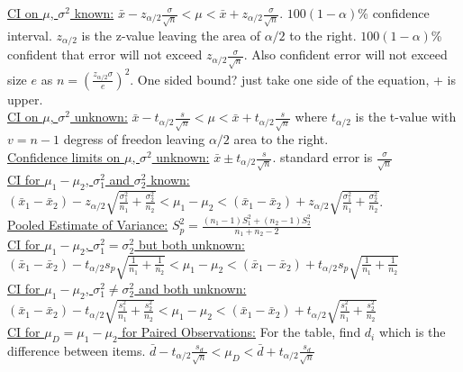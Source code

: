 \documentclass[9pt]{article}
\begin{document}
    \begin{multicols}{2}
        \noindent\uline{CI on $\mu$, $\sigma^2$ known:} $\bar{x}-z_{\alpha/2}\frac{\sigma}{\sqrt{n}} < \mu < \bar{x}+z_{\alpha/2}\frac{\sigma}{\sqrt{n}}$. $100(1-\alpha)$\% confidence interval.
        $z_{\alpha/2}$ is the z-value leaving the area of $\alpha/2$ to the right. $100(1-\alpha)$\% confident that error will not exceed $z_{\alpha/2}\frac{\sigma}{\sqrt{n}}$. Also confident error
        will not exceed size $e$ as $n=(\frac{z_{\alpha/2}\sigma}{e})^2$. One sided bound? just take one side of the equation, + is upper.\\
        \uline{CI on $\mu$, $\sigma^2$ unknown:} $\bar{x}-t_{\alpha/2}\frac{s}{\sqrt{n}} < \mu < \bar{x}+t_{\alpha/2}\frac{s}{\sqrt{n}}$ where $t_{\alpha/2}$ is the t-value with $v=n-1$ degress of freedon
        leaving $\alpha/2$ area to the right.\\
        \uline{Confidence limits on $\mu$, $\sigma^2$ unknown:} $\bar{x}\pm t_{\alpha/2}\frac{s}{\sqrt{n}}$. standard error is $\frac{\sigma}{\sqrt{n}}$\\
        \uline{CI for $\mu_1-\mu_2$, $\sigma_1^2$ and $\sigma_2^2$ known:} $(\bar{x}_1-\bar{x}_2)-z_{\alpha/2}\sqrt{\frac{\sigma_1^2}{n_1}+\frac{\sigma_2^2}{n_2}} < \mu_1-\mu_2 < (\bar{x}_1-\bar{x}_2)+z_{\alpha/2}\sqrt{\frac{\sigma_1^2}{n_1}+\frac{\sigma_2^2}{n_2}}$.\\
        \uline{Pooled Estimate of Variance:} $S_p^2=\frac{(n_1-1)S_1^2+(n_2-1)S^2_2}{n_1+n_2-2}$\\
        \uline{CI for $\mu_1-\mu_2$, $\sigma_1^2=\sigma_2^2$ but both unknown:} \\$(\bar{x}_1-\bar{x}_2)-t_{\alpha/2}s_p\sqrt{\frac{1}{n_1}+\frac{1}{n_2}} < \mu_1-\mu_2 < (\bar{x}_1-\bar{x}_2)+t_{\alpha/2}s_p\sqrt{\frac{1}{n_1}+\frac{1}{n_2}}$\\
        \uline{CI for $\mu_1-\mu_2$, $\sigma_1^2\not=\sigma_2^2$ and both unknown:} \\$(\bar{x}_1-\bar{x}_2)-t_{\alpha/2}\sqrt{\frac{s_1^2}{n_1}+\frac{s_2^2}{n_2}} < \mu_1-\mu_2 < (\bar{x}_1-\bar{x}_2)+t_{\alpha/2}\sqrt{\frac{s_1^2}{n_1}+\frac{s_2^2}{n_2}}$\\
        \uline{CI for $\mu_D=\mu_1-\mu_2$ for Paired Observations:} For the table, find $d_i$ which is the difference between items. $\bar{d}-t_{\alpha/2}\frac{s_d}{\sqrt{n}} < \mu_D < \bar{d}+t_{\alpha/2}\frac{s_d}{\sqrt{n}}$
    \end{multicols}
\end{document}
